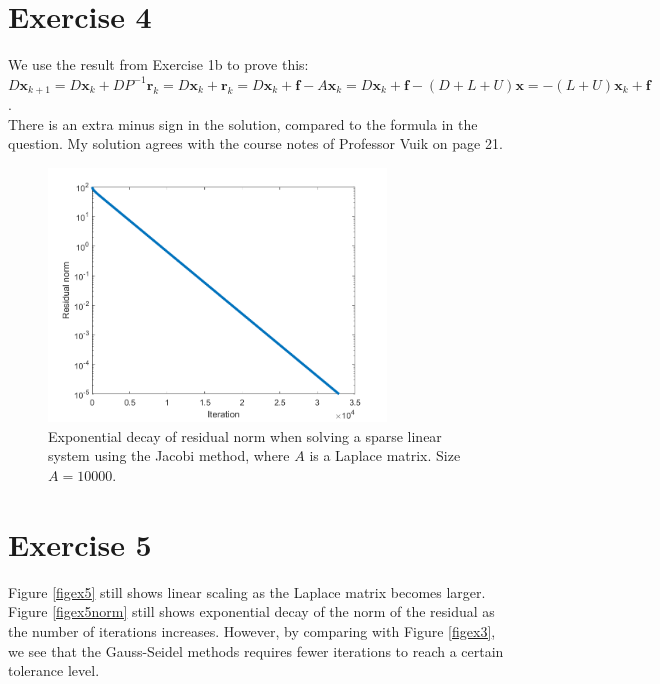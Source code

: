 \documentclass{article}
\begin{document}
\section*{Exercise 4}
We use the result from Exercise 1b to prove this:
\\
$D\bm x_{k+1} = D\bm x_k + DP^{-1}\bm r_k =  D\bm x_k + \bm r_k = D\bm x_k + \bm f - A\bm x_k = D\bm x_k + \bm f - (D + L + U)\bm x = -(L+U)\bm x_k + \bm f$.\\
There is an extra minus sign in the solution, compared to the formula in the question.
My solution agrees with the course notes of Professor Vuik on page 21.
\begin{figure}[h]
	\centering
	\includegraphics[width=0.8\textwidth]{ex3_norm.png}
	\caption{Exponential decay of residual norm when solving a sparse linear system using the Jacobi method, where $A$ is a Laplace matrix. Size $A = 10000$.}
	\label{figex3norm}
\end{figure}
\section*{Exercise 5}
Figure \ref{figex5} still shows linear scaling as the Laplace matrix becomes larger.
Figure \ref{figex5norm} still shows exponential decay of the norm of the residual as the number of iterations increases. However, by comparing with Figure \ref{figex3}, we see that the Gauss-Seidel methods requires fewer iterations to reach a certain tolerance level.
\end{document}
